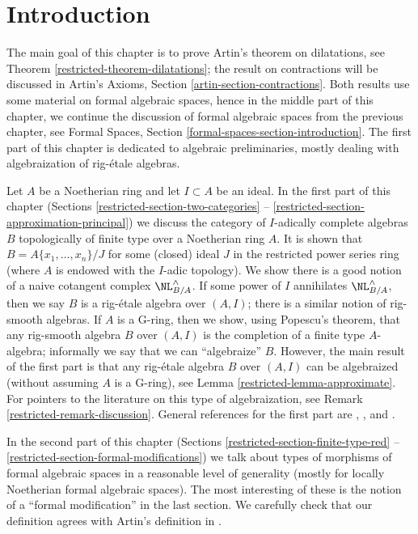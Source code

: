\section{Introduction}
\label{restricted-section-introduction}
The main goal of this chapter is to prove Artin's theorem on dilatations,
see Theorem \ref{restricted-theorem-dilatations}; the result on contractions will be
discussed in Artin's Axioms, Section \ref{artin-section-contractions}.
Both results use some material on formal algebraic spaces, hence
in the middle part of this chapter, we
continue the discussion of formal algebraic spaces from the previous
chapter, see Formal Spaces, Section \ref{formal-spaces-section-introduction}.
The first part of this chapter is dedicated to algebraic preliminaries,
mostly dealing with algebraization of rig-\'etale algebras.

\medskip\noindent
Let $A$ be a Noetherian ring and let $I \subset A$ be an ideal. In the
first part of this chapter (Sections \ref{restricted-section-two-categories}
-- \ref{restricted-section-approximation-principal})
we discuss the category of $I$-adically complete algebras $B$
topologically of finite type over a Noetherian ring $A$.
It is shown that $B = A\{x_1, \ldots, x_n\}/J$ for some
(closed) ideal $J$ in the restricted power series ring
(where $A$ is endowed with the $I$-adic topology).
We show there is a good notion of a naive cotangent complex
$\NL_{B/A}^\wedge$. If some power of $I$ annihilates
$\NL_{B/A}^\wedge$, then we say $B$ is a rig-\'etale algebra
over $(A, I)$; there is a similar notion of rig-smooth algebras.
If $A$ is a G-ring, then we show, using Popescu's theorem,
that any rig-smooth algebra $B$ over $(A, I)$ is the completion
of a finite type $A$-algebra; informally we say that we can ``algebraize'' $B$.
However, the main result of the first part is that any rig-\'etale
algebra $B$ over $(A, I)$ can be algebraized (without assuming $A$ is
a G-ring), see Lemma \ref{restricted-lemma-approximate}. For pointers to the literature
on this type of algebraization, see Remark \ref{restricted-remark-discussion}.
General references for the first part are
\cite{EGA}, \cite{Abbes}, and \cite{Fujiwara-Kato}.

\medskip\noindent
In the second part of this chapter
(Sections \ref{restricted-section-finite-type-red} -- \ref{restricted-section-formal-modifications})
we talk about types of morphisms of formal algebraic spaces
in a reasonable level of generality (mostly for locally Noetherian
formal algebraic spaces). The most interesting of these is
the notion of a ``formal modification'' in the last section.
We carefully check that our definition agrees with
Artin's definition in \cite{ArtinII}.

